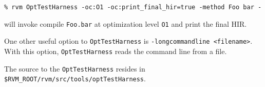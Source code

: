 \begin{verbatim}
% rvm OptTestHarness -oc:O1 -oc:print_final_hir=true -method Foo bar -
\end{verbatim} 
will invoke compile {\tt Foo.bar} at optimization level {\tt O1} and print
the final HIR.

One other useful option to {\tt OptTestHarness} is {\tt -longcommandline
<filename>}. With this option, {\tt OptTestHarness} reads the command line
from a file.

The source to the {\tt OptTestHarness} resides in 
{\tt \$RVM\_ROOT/rvm/src/tools/optTestHarness}.
